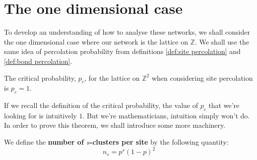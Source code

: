 \section{The one dimensional case}
To develop an understanding of how to analyse these networks, we shall consider the one dimensional case where our network is the lattice on $\mathbb{Z}$. We shall use the same
idea of percolation probability from definitions \ref{def:site percolation} and \ref{def:bond percolation}.

\begin{theorem}\label{thm:critical probability z1 site percolation}
  The critical probability, $p_c$, for the lattice on $\mathbb{Z}^2$ when considering site percolation is $p_c = 1$.
\end{theorem}

If we recall the definition of the critical probability, the value of $p_c$ that we're looking for is intuitively $1$. But we're mathematicians, intuition simply won't do. In order
to prove this theorem, we shall introduce some more machinery.

\begin{definition}\label{def:s-clusters per site}
  We define the \textbf{number of $s$-clusters per site} by the following quantity:
  $$n_s = p^s(1-p)^2$$
\end{definition}
